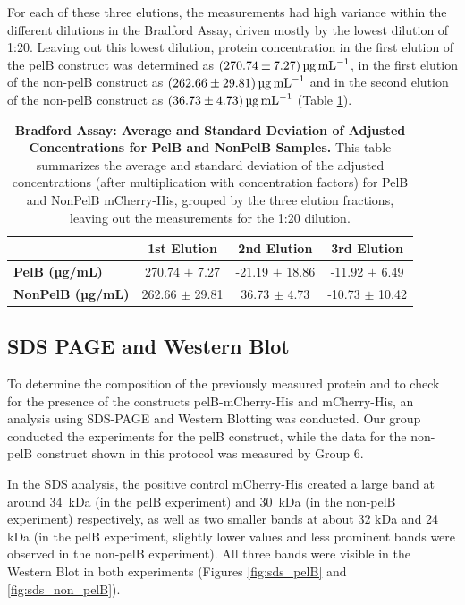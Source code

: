 \documentclass[a4paper,12pt]{article}
\begin{document}
For each of these three elutions, the measurements had high variance within the different dilutions in the Bradford Assay, driven mostly by the lowest dilution of 1:20. Leaving out this lowest dilution, protein concentration in the first elution of the pelB construct was determined as $\SI{270.74\pm 7.27}{\micro\gram\per\milli\liter}$, in the first elution of the non-pelB construct as $\SI{262.66\pm 29.81}{\micro\gram\per\milli\liter}$ and in the second elution of the non-pelB construct as $\SI{36.73 \pm 4.73}{\micro\gram\per\milli\liter}$ (Table \ref{tab:bradford3}).

\begin{table}[h!]
    \centering
    \caption{\textbf{Bradford Assay: Average and Standard Deviation of Adjusted Concentrations for PelB and NonPelB Samples.} This table summarizes the average and standard deviation of the adjusted concentrations (after multiplication with concentration factors) for PelB and NonPelB mCherry-His, grouped by the three elution fractions, leaving out the measurements for the 1:20 dilution.}
    \begin{tabular}{lccc}
        & \textbf{1st Elution} & \textbf{2nd Elution} & \textbf{3rd Elution}\\
        \hline
        \textbf{PelB (µg/mL)} & 270.74 $\pm$ 7.27 & -21.19 $\pm$ 18.86 & -11.92 $\pm$ 6.49 \\
        \textbf{NonPelB (µg/mL)} & 262.66 $\pm$ 29.81 & 36.73 $\pm$ 4.73 & -10.73 $\pm$ 10.42  \\
        \hline
    \end{tabular}
    \label{tab:bradford3}
\end{table}

\subsection{SDS PAGE and Western Blot}
To determine the composition of the previously measured protein and to check for the presence of the constructs pelB-mCherry-His and mCherry-His, an analysis using SDS-PAGE and Western Blotting was conducted. Our group conducted the experiments for the pelB construct, while the data for the non-pelB construct shown in this protocol was measured by Group 6.

In the SDS analysis, the positive control mCherry-His created a large band at around 34~kDa (in the pelB experiment) and 30~kDa (in the non-pelB experiment) respectively, as well as two smaller bands at about 32 kDa and 24 kDa (in the pelB experiment, slightly lower values and less prominent bands were observed in the non-pelB experiment). All three bands were visible in the Western Blot in both experiments (Figures \ref{fig:sds_pelB} and \ref{fig:sds_non_pelB}). 
\end{document}
